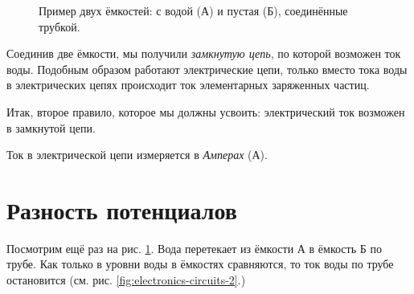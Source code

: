 \documentclass[a4paper,twoside]{book}
\begin{document}
\begin{figure}[ht]
  \centering
  \caption{Пример двух ёмкостей: с водой (А) и пустая (Б), соединённые трубкой.}
  \label{fig:electronics-circuits-1}
\end{figure}

Соединив две ёмкости, мы получили \emph{замкнутую цепь}, по которой возможен ток
воды.  Подобным образом работают электрические цепи, только вместо тока воды в
электрических цепях происходит ток элементарных заряженных частиц.

Итак, второе правило, которое мы должны усвоить: электрический ток возможен в
замкнутой цепи.

Ток в электрической цепи измеряется в \emph{Амперах} (А).

\section{Разность потенциалов}

Посмотрим ещё раз на рис. \ref{fig:electronics-circuits-1}.  Вода перетекает из
ёмкости А в ёмкость Б по трубе.  Как только в уровни воды в ёмкостях сравняются,
то ток воды по трубе остановится (см. рис. \ref{fig:electronics-circuits-2}.)
\end{document}

